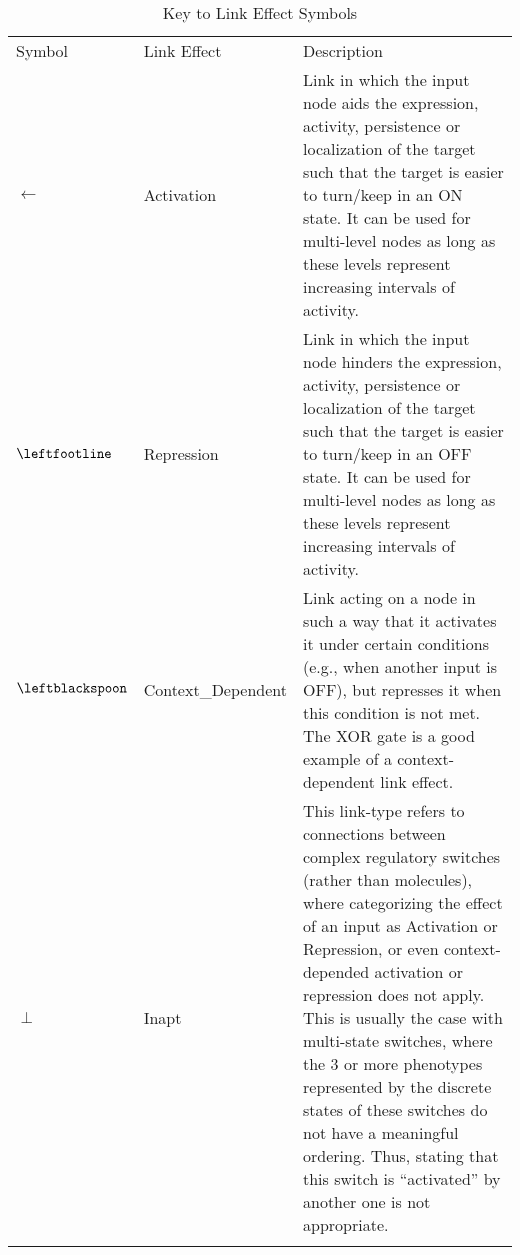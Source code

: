 \documentclass{article}
\begin{document}
\begin{subtables}
\begin{longtable}[c]{@{}llp{}@{}}
\caption{Key to Link Effect Symbols}
\endhead{}\\
\toprule
Symbol&Link Effect&Description\\
\midrule
$\leftarrow$&Activation&Link in which the input node aids the expression, activity, persistence or localization of the target such that the target is easier to turn/keep in an ON state. It can be used for multi-level nodes as long as these levels represent increasing intervals of activity.\\
$\leftfootline$&Repression&Link in which the input node hinders the expression, activity, persistence or localization of the target such that the target is easier to turn/keep in an OFF state. It can be used for multi-level nodes as long as these levels represent increasing intervals of activity.\\
$\leftblackspoon$&Context\_{}Dependent&Link acting on a node in such a way that it activates it under certain conditions (e.g., when another input is OFF), but represses it when this condition is not met. The XOR gate is a good example of a context-dependent link effect. \\
$\perp$&Inapt&This link-type refers to connections between complex regulatory switches (rather than molecules), where categorizing the effect of an input as Activation or Repression, or even context-depended activation or repression does not apply. This is usually the case with multi-state switches, where the 3 or more phenotypes represented by the discrete states of these switches do not have a meaningful ordering. Thus, stating that this switch is “activated” by another one is not appropriate.\\
\bottomrule
\end{longtable}
\end{subtables}\newpage{}

\end{document}
